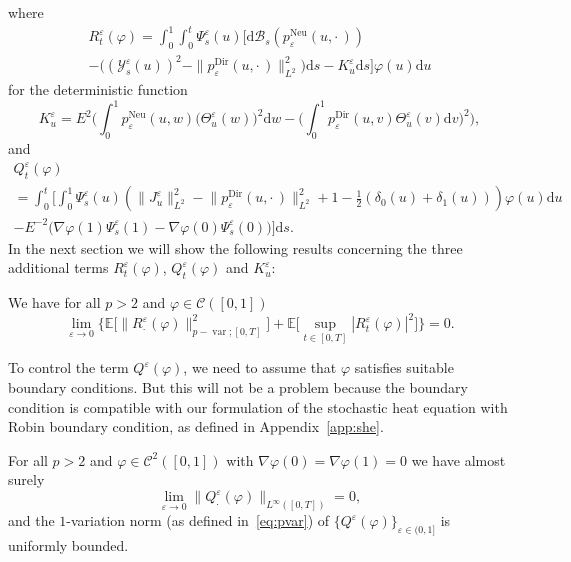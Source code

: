 \documentclass[AHL,Unicode,longabstracts]{cedram}
\DeclareMathOperator{\Dir}{Dir}
\DeclareMathOperator{\Neu}{Neu}
\DeclareMathOperator{\var}{var}
\newcommand{\mc}[1]{{\mathcal #1}}
\renewcommand{\mc}[1]{{\mathcal #1}}
\newcommand*{\dd}{\mathrm{d}}
\newcommand*{\ds}{\dd s}
\newcommand*{\du}{\dd u}
\newcommand*{\dv}{\dd v}
\newcommand*{\dw}{\dd w}
\renewcommand{\tfrac}{\frac}
\begin{document}
where
\begin{multline}\label{eq:remainder-1}
R^{\varepsilon}_t (\varphi) = \int_0^1 \int_0^t \Psi^{\varepsilon}_s (u) \Big[\dd \mathcal{B}_s (p^{\Neu}_{\varepsilon} (u, \cdot\,)) \\
-\big((\mc Y^{\varepsilon}_s (u))^2 -\|p^{\Dir}_{\varepsilon} (u, \cdot\,) \|_{L^2}^2\big) \ds - K^{\varepsilon}_u \ds\Big] \varphi (u) \du
\end{multline}
for the deterministic function
\begin{equation}\label{eq:K-def}
K^{\varepsilon}_u = E^2 \bigg(\int_0^1 p^{\Neu}_{\varepsilon} (u, w) \big(\Theta^{\varepsilon}_u (w)\big)^2 \dw - \bigg(\int_0^1 p^{\Dir}_{\varepsilon} (u, v) \Theta^{\varepsilon}_u (v) \dv \bigg)^2 \bigg),
\end{equation}
and
\begin{multline}\label{eq:remainder-2}
Q^{\varepsilon}_t (\varphi)\\ = \int_0^t \bigg[\int_0^1
\Psi^{\varepsilon}_s (u) \left(\big\| J^{\varepsilon}_u \big\|_{L^2}^2 - \big\| p^{\Dir}_{\varepsilon} (u, \cdot\,) \big\|_{L^2}^2 + 1 - \tfrac12 (\delta_0(u) + \delta_1(u)) \right) \varphi (u) \du \\ - E^{- 2} \big(\nabla \varphi (1) \Psi^{\varepsilon}_s (1) - \nabla \varphi (0) \Psi^{\varepsilon}_s (0)\big) \bigg] \ds.
\end{multline}
In the next section we will show the following results concerning the three additional terms $R_t^\varepsilon(\varphi)$, $Q_t^\varepsilon(\varphi)$ and $K_u^\varepsilon$:

\begin{lemm}\label{lem:remainder-1}
We have for all $p > 2$ and $\varphi \in \mc C([0, 1])$
\begin{equation}\label{eq:Rvan}
\lim_{\varepsilon \rightarrow 0} \Big\{ \mathbb{E} \big[\| R^{\varepsilon}_\cdot
(\varphi) \|_{p - \var ; [0, T]}^2\big] +\mathbb{E} \Big[\sup_{t \in[0,T]} | R^{\varepsilon}_t (\varphi) |^2\Big] \Big\} = 0.
\end{equation}
\end{lemm}

To control the term $Q^\varepsilon(\varphi)$, we need to assume that $\varphi$ satisfies suitable boundary conditions. But this will not be a problem because the boundary condition is compatible with our formulation of the stochastic heat equation with Robin boundary condition, as defined in Appendix~\ref{app:she}.

\begin{lemm}\label{lem:remainder-2}
For all $p > 2$ and $\varphi \in \mc C^2([0,1])$ with $\nabla \varphi(0) = \nabla \varphi(1) = 0$ we have almost surely
\[
\lim_{\varepsilon \rightarrow 0} \big\| Q^{\varepsilon}_\cdot (\varphi) \big\|_{L^\infty([0,T])} = 0,
\]
and the $1$-variation norm (as defined in~\eqref{eq:pvar}) of $\big\{Q^\varepsilon(\varphi)\big\}_{\varepsilon \in (0,1]}$ is uniformly bounded.
\end{lemm}
\end{document}
